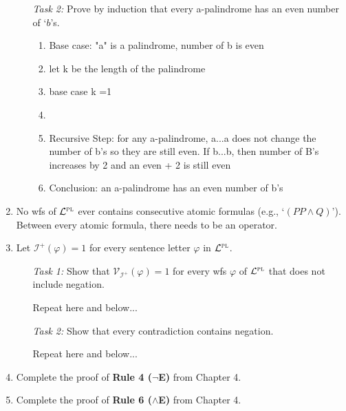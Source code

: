 \documentclass[12pt]{article}
\newcommand{\I}{\mathcal{I}} %
\newcommand{\PL}{\mathcal{L}^{\textsc{pl}}} %
\newcommand{\V}[1]{\mathcal{V}_{#1}} %
\newcommand{\answer}[1]{%
  \par\noindent
  \begin{tcolorbox}[colback=gray!10, colframe=gray!80, title=Proof]
    #1
  \end{tcolorbox}
}
\begin{document}
\begin{enumerate}
\begin{enumerate}[leftmargin=.75in]
{      }
    \item[\it Task 2:] Prove by induction that every a-palindrome has an even number of `$b$'s.
      \answer{
        \begin{enumerate}[label=\arabic*.]
          \item Base case: "a" is a palindrome, number of b is even
          \item let k be the length of the palindrome
          \item base case k =1
          \item 
          \item Recursive Step: for any a-palindrome, a...a does not change the number of b's
                so they are still even. If b...b, then number of B's increases by 2 and an even + 2 is still even
          \item Conclusion: an a-palindrome has an even number of b's
        \end{enumerate}
      }
  \end{enumerate}


  \item No wfs of $\PL$ ever contains consecutive atomic formulas (e.g., `$(PP \wedge Q)$').
      Between every atomic formula, there needs to be an operator.
  \item
    Let $\I^+(\varphi) = 1$ for every sentence letter $\varphi$ in $\PL$.
    \begin{enumerate}[leftmargin=.75in]
      \item[\it Task 1:] Show that $\V{\I^+}(\varphi) = 1$ for every wfs $\varphi$ of $\PL$ that does not include negation. 
        \answer{
          Repeat here and below...
        }
      \item[\it Task 2:] Show that every contradiction contains negation.
        \answer{
          Repeat here and below...
        }
    \end{enumerate}
    
  \item Complete the proof of \textbf{Rule 4 ($\neg$E)} from Chapter 4.

  \item Complete the proof of \textbf{Rule 6 ($\wedge$E)} from Chapter 4.

\end{enumerate}
\end{document}
